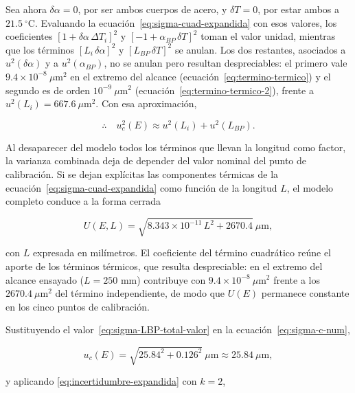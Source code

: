 Sea ahora $\delta\alpha = 0$, por ser ambos cuerpos de acero, y $\delta T = 0$, por
estar ambos a $21.5\ ^\circ\text{C}$. Evaluando la
ecuación~\eqref{eq:sigma-cuad-expandida} con esos valores, los coeficientes
$[1+\delta\alpha\,\Delta T_i]^2$ y $[-1+\alpha_{BP}\,\delta T]^2$ toman el valor
unidad, mientras que los términos $[L_i\,\delta\alpha]^2$ y
$[L_{BP}\,\delta T]^2$ se anulan. Los dos restantes, asociados a
$u^2(\delta\alpha)$ y a $u^2(\alpha_{BP})$, no se anulan pero resultan
despreciables: el primero vale $9.4\times10^{-8}\ \mu\text{m}^2$ en el extremo del
alcance (ecuación~\eqref{eq:termino-termico}) y el segundo es de orden
$10^{-9}\ \mu\text{m}^2$ (ecuación~\eqref{eq:termino-termico-2}), frente a
$u^2(L_i) = 667.6\ \mu\text{m}^2$. Con esa aproximación,

\begin{equation}
    \therefore\quad u_c^2(E) \approx u^2(L_i) + u^2(L_{BP}).
    \label{eq:sigma-c-num}
\end{equation}

Al desaparecer del modelo todos los términos que llevan la longitud como factor, la
varianza combinada deja de depender del valor nominal del punto de calibración. Si se
dejan explícitas las componentes térmicas de la
ecuación~\eqref{eq:sigma-cuad-expandida} como función de la longitud $L$, el modelo
completo conduce a la forma cerrada

\begin{equation}
    U(E,L) = \sqrt{8.343\times10^{-11}\,L^2 + 2670.4}\ \mu\text{m},
    \label{eq:U-vecL}
\end{equation}

con $L$ expresada en milímetros. El coeficiente del término cuadrático reúne el aporte
de los términos térmicos, que resulta despreciable: en el extremo del alcance ensayado
($L = 250$ mm) contribuye con $9.4\times10^{-8}\ \mu\text{m}^2$ frente a los
$2670.4\ \mu\text{m}^2$ del término independiente, de modo que $U(E)$ permanece
constante en los cinco puntos de calibración.

Sustituyendo el valor~\eqref{eq:sigma-LBP-total-valor} en la
ecuación~\eqref{eq:sigma-c-num},

\begin{equation}
    u_c(E) = \sqrt{25.84^2 + 0.126^2}\ \mu\text{m}
    \approx 25.84\ \mu\text{m},
    \label{eq:sigma-c-num-valor}
\end{equation}

y aplicando \eqref{eq:incertidumbre-expandida} con $k = 2$,

